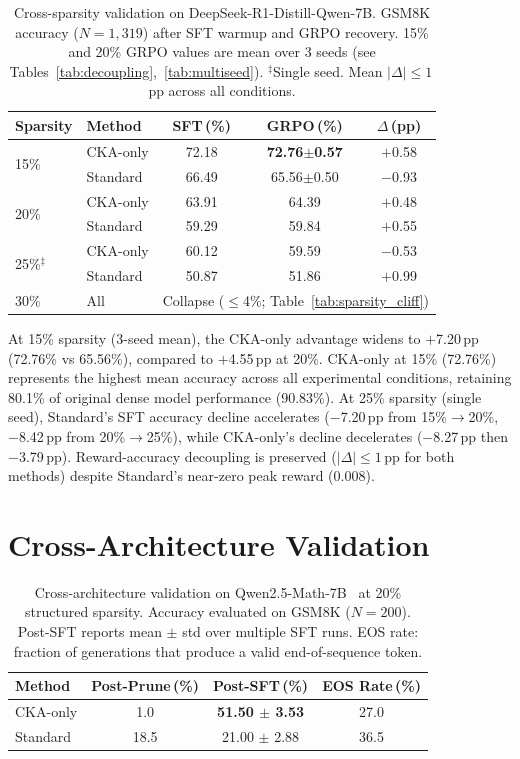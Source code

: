 \begin{table}[h]
\centering
\small
\caption{Cross-sparsity validation on DeepSeek-R1-Distill-Qwen-7B. GSM8K accuracy ($N{=}1{,}319$) after SFT warmup and GRPO recovery. 15\% and 20\% GRPO values are mean over 3 seeds (see Tables~\ref{tab:decoupling},~\ref{tab:multiseed}). $^\ddagger$Single seed. Mean $|\Delta| \leq 1$\,pp across all conditions.}
\label{tab:cross_sparsity}
\begin{tabular}{@{}llccc@{}}
\toprule
Sparsity & Method & SFT\,(\%) & GRPO\,(\%) & $\Delta$\,(pp) \\
\midrule
\multirow{2}{*}{15\%} & CKA-only & 72.18 & \textbf{72.76{\scriptsize$\pm$0.57}} & $+$0.58 \\
 & Standard & 66.49 & 65.56{\scriptsize$\pm$0.50} & $-$0.93 \\
\midrule
\multirow{2}{*}{20\%} & CKA-only & 63.91 & 64.39 & $+$0.48 \\
 & Standard & 59.29 & 59.84 & $+$0.55 \\
\midrule
\multirow{2}{*}{25\%$^\ddagger$} & CKA-only & 60.12 & 59.59 & $-$0.53 \\
 & Standard & 50.87 & 51.86 & $+$0.99 \\
\midrule
30\% & All & \multicolumn{3}{c}{Collapse ($\leq$4\%; Table~\ref{tab:sparsity_cliff})} \\
\bottomrule
\end{tabular}
\end{table}

At 15\% sparsity (3-seed mean), the CKA-only advantage widens to $+$7.20\,pp (72.76\% vs 65.56\%), compared to $+$4.55\,pp at 20\%.
CKA-only at 15\% (72.76\%) represents the highest mean accuracy across all experimental conditions, retaining 80.1\% of original dense model performance (90.83\%).
At 25\% sparsity (single seed), Standard's SFT accuracy decline accelerates ($-$7.20\,pp from 15\%$\to$20\%, $-$8.42\,pp from 20\%$\to$25\%), while CKA-only's decline decelerates ($-$8.27\,pp then $-$3.79\,pp).
Reward-accuracy decoupling is preserved ($|\Delta| \leq 1$\,pp for both methods) despite Standard's near-zero peak reward (0.008).

\section{Cross-Architecture Validation}
\label{sec:appendix_cross_arch}

\begin{table}[h]
\centering
\small
\caption{Cross-architecture validation on Qwen2.5-Math-7B~\citep{qwen2.5} at 20\% structured sparsity. Accuracy evaluated on GSM8K ($N{=}200$). Post-SFT reports mean $\pm$ std over multiple SFT runs. EOS rate: fraction of generations that produce a valid end-of-sequence token.}
\label{tab:cross_arch}
\begin{tabular}{@{}lccc@{}}
\toprule
Method & Post-Prune\,(\%) & Post-SFT\,(\%) & EOS Rate\,(\%) \\
\midrule
CKA-only & 1.0 & \textbf{51.50 $\pm$ 3.53} & 27.0 \\
Standard & 18.5 & 21.00 $\pm$ 2.88 & 36.5 \\
\bottomrule
\end{tabular}
\end{table}

